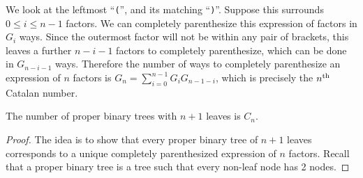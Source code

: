 We look at the leftmost ``\texttt{(}'', and its matching ``\texttt{)}''. Suppose this surrounds $0 \leq i \leq n-1$ factors. We can completely parenthesize this expression of factors in $G_{i}$ ways. Since the outermost factor will not be within any pair of brackets, this leaves a further $n-i-1$ factors to completely parenthesize, which can be done in $G_{n-i-1}$ ways. Therefore the number of ways to completely parenthesize an expression of $n$ factors is ${G_{n}=\sum_{i=0}^{n-1}G_{i}G_{n-1-i}}$, which is precisely the $n\textsuperscript{th}$ Catalan number.
\begin{theorem}
    The number of proper binary trees with $n+1$ leaves is $C_n$.
\end{theorem}
\begin{proof}
    The idea is to show that every proper binary tree of $n+1$ leaves corresponds to a unique completely parenthesized expression of $n$ factors. Recall that a proper binary tree is a tree such that every non-leaf node has 2 nodes. 
\end{proof}